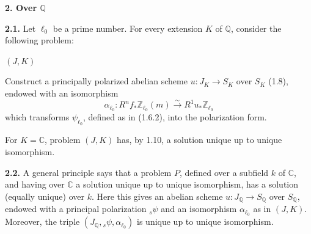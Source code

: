 \documentclass[10pt]{article}
\newcommand{\C}{\mathbb C}
\newcommand{\Q}{\mathbb Q}
\newcommand{\Z}{\mathbb Z}
\newcommand{\iso}{\xrightarrow{\sim}}
\begin{document}
\begin{center}\bfseries 2. Over \(\Q\)\end{center}

\noindent\textbf{2.1.} Let \(\ell_0\) be a prime number. For every extension \(K\) of \(\Q\), consider the following problem:

\noindent\((J,K)\)\quad
\begin{minipage}[t]{0.82\linewidth}
Construct a principally polarized abelian scheme \(u:J_K\longrightarrow S_K\) over \(S_K\) (1.8), endowed with an isomorphism
\[
\alpha_{\ell_0}:R^nf_*\Z_{\ell_0}(m)\iso R^1u_*\Z_{\ell_0}
\]
which transforms \(\psi_{\ell_0}\), defined as in (1.6.2), into the polarization form.
\end{minipage}

For \(K=\C\), problem \((J,K)\) has, by 1.10, a solution unique up to unique isomorphism.

\noindent\textbf{2.2.} A general principle says that a problem \(P\), defined over a subfield \(k\) of \(\C\), and having over \(\C\) a solution unique up to unique isomorphism, has a solution (equally unique) over \(k\). Here this gives an abelian scheme \(u:J_\Q\longrightarrow S_\Q\) over \(S_\Q\), endowed with a principal polarization \({}_s\psi\) and an isomorphism \(\alpha_{\ell_0}\) as in \((J,K)\). Moreover, the triple \((J_\Q,{}_s\psi,\alpha_{\ell_0})\) is unique up to unique isomorphism.
\end{document}

